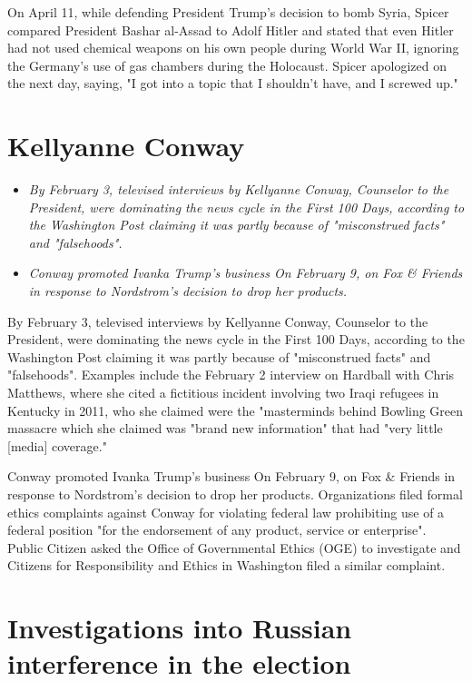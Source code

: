 On April 11, while defending President Trump's decision to bomb Syria,
Spicer compared President Bashar al-Assad to Adolf Hitler and stated
that even Hitler had not used chemical weapons on his own people during
World War II, ignoring the Germany's use of gas chambers during the
Holocaust. Spicer apologized on the next day, saying, "I got into a
topic that I shouldn't have, and I screwed up."

\section{Kellyanne Conway}\label{kellyanne-conway}

\begin{itemize}
\item
  \emph{By February 3, televised interviews by Kellyanne Conway,
  Counselor to the President, were dominating the news cycle in the
  First 100 Days, according to the Washington Post claiming it was
  partly because of "misconstrued facts" and "falsehoods".}
\item
  \emph{Conway promoted Ivanka Trump's business On February 9, on Fox \&
  Friends in response to Nordstrom's decision to drop her products.}
\end{itemize}

By February 3, televised interviews by Kellyanne Conway, Counselor to
the President, were dominating the news cycle in the First 100 Days,
according to the Washington Post claiming it was partly because of
"misconstrued facts" and "falsehoods". Examples include the February 2
interview on Hardball with Chris Matthews, where she cited a fictitious
incident involving two Iraqi refugees in Kentucky in 2011, who she
claimed were the "masterminds behind Bowling Green massacre which she
claimed was "brand new information" that had "very little {[}media{]}
coverage."

Conway promoted Ivanka Trump's business On February 9, on Fox \& Friends
in response to Nordstrom's decision to drop her products. Organizations
filed formal ethics complaints against Conway for violating federal law
prohibiting use of a federal position "for the endorsement of any
product, service or enterprise". Public Citizen asked the Office of
Governmental Ethics (OGE) to investigate and Citizens for Responsibility
and Ethics in Washington filed a similar complaint.

\section{Investigations into Russian interference in the
election}\label{investigations-into-russian-interference-in-the-election}

